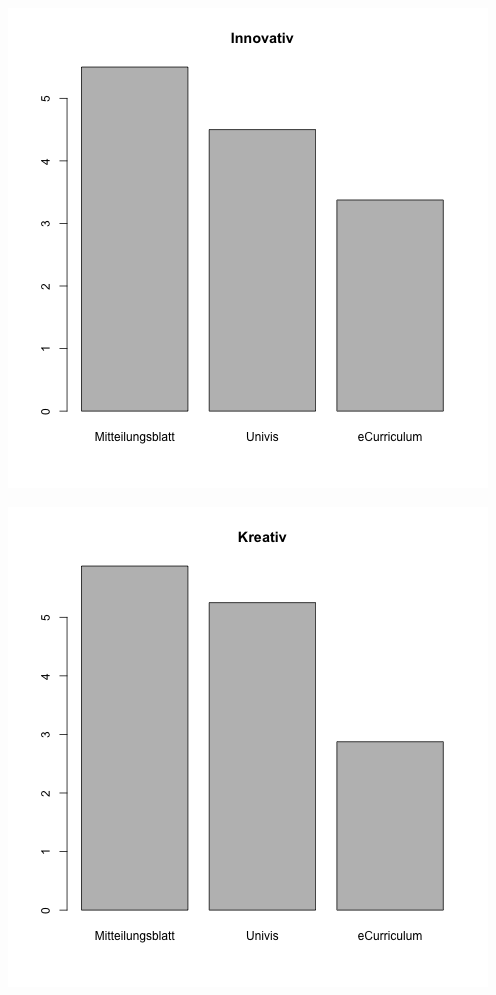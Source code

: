 \documentclass[a4paper,10pt]{scrartcl}
\begin{document}
\begin{center}
 \includegraphics[width=\linewidth]{./Appendix/Plots/Barplots/barplot5.png}
\end{center}
\begin{center}
 \includegraphics[width=\linewidth]{./Appendix/Plots/Barplots/barplot6.png}
\end{center}
\end{document}
